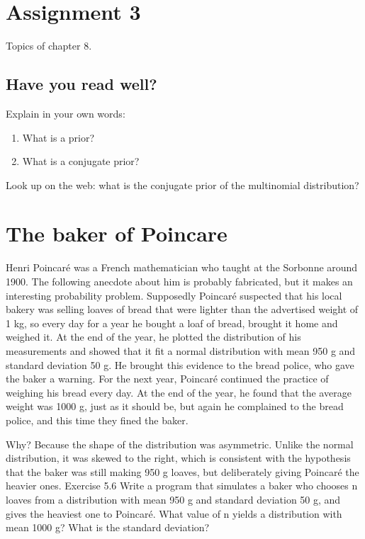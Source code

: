\documentclass[assignments]{subfiles}
\begin{document}
\section{Assignment 3}
\label{sec:assignment-3}

Topics of chapter 8.

\subsection{Have you read well?}
\label{sec:have-you-read-1}

\begin{exercise}
Explain in your own words: 
\begin{enumerate}
\item What is a prior?
\item What is a conjugate prior?
\end{enumerate}
\end{exercise}

\begin{exercise}
Look up on the web: what is the conjugate prior of the multinomial distribution?
\end{exercise}



\section{The baker of Poincare}
\label{sec:org94bc890}


Henri Poincaré was a French mathematician who taught at the Sorbonne around 1900. The following anecdote about him is probably fabricated, but it makes an interesting probability problem.
Supposedly Poincaré suspected that his local bakery was selling loaves of bread that were lighter than the advertised weight of 1 kg, so every day for a year he bought a loaf of bread, brought it home and weighed it. At the end of the year, he plotted the distribution of his measurements and showed that it fit a normal distribution with mean 950 g and standard deviation 50 g. He brought this evidence to the bread police, who gave the baker a warning.
For the next year, Poincaré continued the practice of weighing his bread every day. At the end of the year, he found that the average weight was 1000 g, just as it should be, but again he complained to the bread police, and this time they fined the baker.


Why? Because the shape of the distribution was asymmetric. Unlike the normal distribution, it was skewed to the right, which is consistent with the hypothesis that the baker was still making 950 g loaves, but deliberately giving Poincaré the heavier ones.
Exercise 5.6 Write a program that simulates a baker who chooses n loaves from a distribution with mean 950 g and standard deviation 50 g, and gives the heaviest one to Poincaré. What value of n yields a distribution with mean 1000 g? What is the standard deviation?
\end{document}
